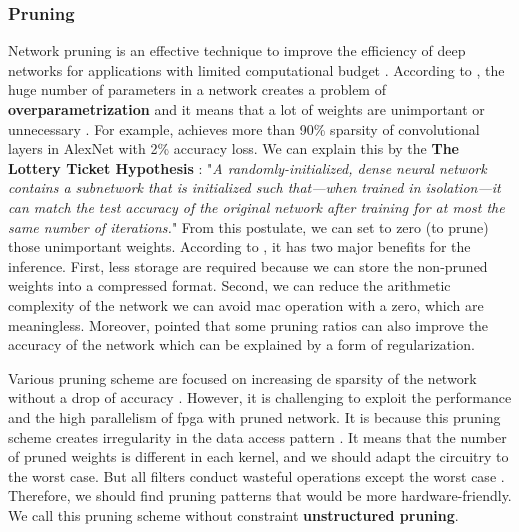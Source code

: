 \subsubsection{Pruning} \label{subs:pruning}
Network pruning is an effective technique to improve the efficiency of deep networks for applications with limited computational budget \cite{liu_rethinking_2019}. According to \textcite{denton_exploiting_2014, liu_rethinking_2019}, the huge number of parameters in a network creates a problem of \textbf{overparametrization} and it means that a lot of weights are unimportant or unnecessary \cite{cheng_recent_2018}. For example, \textcite{baoyuan_liu_sparse_2015} achieves more than 90\% sparsity of convolutional layers in AlexNet with 2\% accuracy loss. We can explain this by the \textbf{The Lottery Ticket Hypothesis} \cite{frankle_lottery_2019, frankle_early_2020}: "\textit{A randomly-initialized, dense neural network contains a subnetwork that is initialized such that—when trained in isolation—it can match the test accuracy of the original network after training for at most the same number of iterations.}" From this postulate, we can set to zero (to prune) those unimportant weights. According to \textcite{cheng_recent_2018}, it has two major benefits for the inference. First, less storage are required because we can store the non-pruned weights into a compressed format. Second, we can reduce the arithmetic complexity of the network we can avoid \acrshort{mac} operation with a zero, which are meaningless. Moreover, \textcite{han_learning_2015, mao_exploring_2017, kang_accelerator-aware_2020} pointed that some pruning ratios can also improve the accuracy of the network which can be explained by a form of regularization.

 Various pruning scheme are focused on increasing de sparsity of the network without a drop of accuracy \cite{han_learning_2015, han_deep_2016}. However, it is challenging to exploit the performance and the high parallelism of \acrshort{fpga} with pruned network. It is because this pruning scheme creates irregularity in the data access pattern \cite{zhu_efficient_2020}. It means that the number of pruned weights is different in each kernel, and we should adapt the circuitry to the worst case. But all filters conduct wasteful operations except the worst case \cite{shimoda_filter-wise_2019}. Therefore, we should find pruning patterns that would be more hardware-friendly. We call this pruning scheme without constraint \textbf{unstructured pruning}. 

